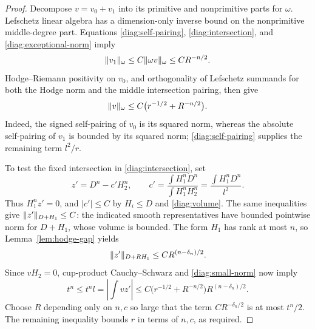 \begin{proof}
Decompose $v=v_0+v_1$ into its primitive and nonprimitive parts for
$\omega$.  Lefschetz linear algebra has a dimension-only inverse bound
on the nonprimitive middle-degree part.  Equations
\eqref{diag:self-pairing}, \eqref{diag:intersection}, and
\eqref{diag:exceptional-norm} imply
\[
 \lVert v_1\rVert_\omega\le C\lVert\omega v\rVert_\omega
                  \le C R^{-n/2}.
\]
Hodge--Riemann positivity on $v_0$, and orthogonality of Lefschetz
summands for both the Hodge norm and the middle intersection pairing,
then give
\begin{equation}\label{diag:small-norm}
 \lVert v\rVert_\omega\le C\bigl(r^{-1/2}+R^{-n/2}\bigr).
\end{equation}
Indeed, the signed self-pairing of $v_0$ is its squared norm, whereas
the absolute self-pairing of $v_1$ is bounded by its squared norm;
\eqref{diag:self-pairing} supplies the remaining term $l^2/r$.

To test the fixed intersection in \eqref{diag:intersection}, set
\[
 z'=D^n-c'H_2^n,
 \qquad
 c'=\frac{\int H_1^nD^n}{\int H_1^nH_2^n}
    =\frac{\int H_1^nD^n}{l^2}.
\]
Thus $H_1^n z'=0$, and $|c'|\le C$ by $H_i\le D$ and
\eqref{diag:volume}.  The same inequalities give
$\lVert z'\rVert_{D+H_1}\le C$: the indicated smooth representatives have
bounded pointwise norm for $D+H_1$, whose volume is bounded.  The form
$H_1$ has rank at most $n$, so Lemma~\ref{lem:hodge-gap} yields
\[
 \lVert z'\rVert_{D+RH_1}\le C R^{(n-\delta_n)/2}.
\]
Since $vH_2=0$, cup-product Cauchy--Schwarz and
\eqref{diag:small-norm} now imply
\[
 t^n\le t^nl=\left|\int vz'\right|
 \le C\bigl(r^{-1/2}+R^{-n/2}\bigr)R^{(n-\delta_n)/2}.
\]
Choose $R$ depending only on $n,c$ so large that the term
$C R^{-\delta_n/2}$ is at most $t^n/2$.  The remaining inequality bounds
$r$ in terms of $n,c$, as required.
\end{proof}
